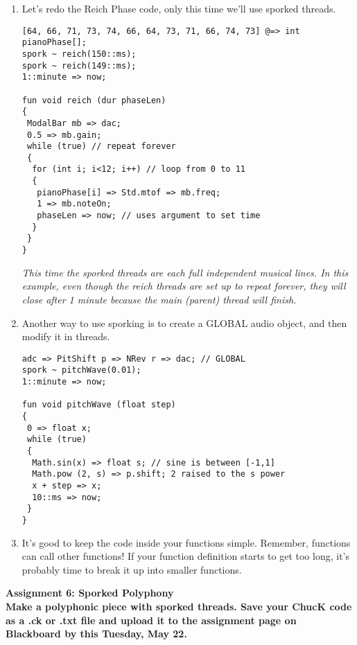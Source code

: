 \documentclass{article}
\begin{document}
\begin {enumerate}
\begin{lstlisting}
spork ~ playNote (60, 1::second); // Don't forget the tilde
spork ~ playNote (62, 500::ms);
spork ~ playNote (67, 500::ms);
2::second => now; // need to keep parent thread alive
\end{lstlisting}

\textsl{We're sporking 3 threads that each consist of a single note. The last line above is needed because the sporked threads are child threads of your main thread, which exit as soon as the parent thread finishes.}

\pagebreak

\item Let's redo the Reich Phase code, only this time we'll use sporked threads.

\begin{lstlisting}
[64, 66, 71, 73, 74, 66, 64, 73, 71, 66, 74, 73] @=> int pianoPhase[]; 
spork ~ reich(150::ms);
spork ~ reich(149::ms);
1::minute => now;

fun void reich (dur phaseLen)
{
 ModalBar mb => dac;
 0.5 => mb.gain;
 while (true) // repeat forever
 {
  for (int i; i<12; i++) // loop from 0 to 11
  {
   pianoPhase[i] => Std.mtof => mb.freq;
   1 => mb.noteOn;
   phaseLen => now; // uses argument to set time
  }
 }
}
\end{lstlisting}

\textsl{This time the sporked threads are each full independent musical lines. In this example, even though the reich threads are set up to repeat forever, they will close after 1 minute because the main (parent) thread will finish.}


\item Another way to use sporking is to create a GLOBAL audio object, and then modify it in threads.

\begin{lstlisting}
adc => PitShift p => NRev r => dac; // GLOBAL
spork ~ pitchWave(0.01);
1::minute => now;

fun void pitchWave (float step)
{
 0 => float x;
 while (true)
 {
  Math.sin(x) => float s; // sine is between [-1,1]
  Math.pow (2, s) => p.shift; 2 raised to the s power
  x + step => x;
  10::ms => now;
 }
}
\end{lstlisting}

\item It's good to keep the code inside your functions simple. Remember, functions can call other functions! If your function definition starts to get too long, it's probably time to break it up into smaller functions.

\end {enumerate}

\textbf{Assignment 6: Sporked Polyphony}\vspace{2mm}
\\
\textbf{Make a polyphonic piece with sporked threads. Save your ChucK code as a .ck or .txt file and upload it to the assignment page on Blackboard by this Tuesday, May 22.}
\end{document}
